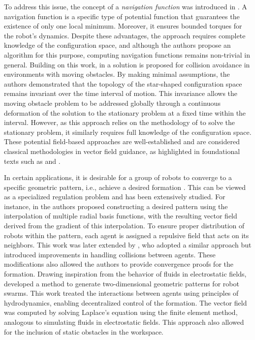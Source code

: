 To address this issue, the concept of a \emph{navigation function} was introduced in \citet{Rimon1992}. A navigation function is a specific type of potential function that guarantees the existence of only one local minimum. Moreover, it ensures bounded torques for the robot's dynamics. Despite these advantages, the approach requires complete knowledge of the configuration space, and although the authors propose an algorithm for this purpose, computing navigation functions remains non-trivial in general. Building on this work, in \citet{Conn1998} a solution is proposed for collision avoidance in environments with moving obstacles. By making minimal assumptions, the authors demonstrated that the topology of the star-shaped configuration space remains invariant over the time interval of motion. This invariance allows the moving obstacle problem to be addressed globally through a continuous deformation of the solution to the stationary problem at a fixed time within the interval. However, as this approach relies on the methodology of \citet{Rimon1992} to solve the stationary problem, it similarly requires full knowledge of the configuration space. These potential field-based approaches are well-established and are considered classical methodologies in vector field guidance, as highlighted in foundational texts such as \citet[p.77]{Choset2005} and \citet[p. 299]{Spong2020}.

In certain applications, it is desirable for a group of robots to converge to a specific geometric pattern, i.e., achieve a desired formation \citep{Chaimowicz2005,Mong-yingA.Hsieh2006,Pimenta2007}. This can be viewed as a specialized regulation problem and has been extensively studied. For instance, in \citet{Chaimowicz2005} the authors proposed constructing a desired pattern using the interpolation of multiple radial basis functions, with the resulting vector field derived from the gradient of this interpolation. To ensure proper distribution of robots within the pattern, each agent is assigned a repulsive field that acts on its neighbors. This work was later extended by \citet{Mong-yingA.Hsieh2006}, who adopted a similar approach but introduced improvements in handling collisions between agents. These modifications also allowed the authors to provide convergence proofs for the formation. Drawing inspiration from the behavior of fluids in electrostatic fields, \citet{Pimenta2007} developed a method to generate two-dimensional geometric patterns for robot swarms. This work treated the interactions between agents using principles of hydrodynamics, enabling decentralized control of the formation. The vector field was computed by solving Laplace's equation using the finite element method, analogous to simulating fluids in electrostatic fields. This approach also allowed for the inclusion of static obstacles in the workspace.

